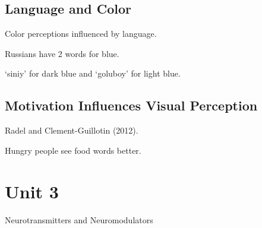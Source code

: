 \subsection{Language and Color}

\begin{coloredlist}
    \item Color perceptions influenced by language.
    \item Russians have 2 words for blue.
    \begin{coloredlist}
        \item `siniy' for dark blue and `goluboy' for light blue.
    \end{coloredlist}
\end{coloredlist}

\subsection{Motivation Influences Visual Perception}

\begin{coloredlist}
    \item Radel and Clement-Guillotin (2012).
    \begin{coloredlist}
        \item Hungry people see food words better.
    \end{coloredlist}
\end{coloredlist}






\section{Unit 3}

\begin{coloredlist}
    \item Neurotransmitters and Neuromodulators
\end{coloredlist}